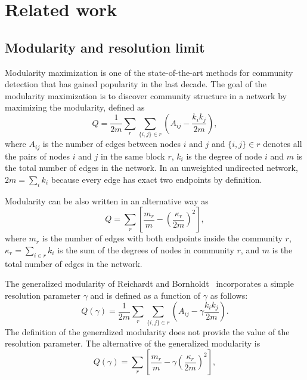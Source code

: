 \section{Related work} \label{sec:2.1}
\subsection{Modularity and resolution limit} \label{sec:2.1.1}
Modularity maximization is one of the state-of-the-art methods for community detection that has gained popularity in the last decade. The goal of the modularity maximization is to discover community structure in a network by maximizing the modularity, defined as
\begin{equation} \label{eq:definition}
    Q = \frac{1}{2m} \sum_{r} \sum_{\{i,j\}\in r} \left( A_{ij} - \frac{ k_i k_j }{ 2m } \right),
\end{equation}
where $A_{ij}$ is the number of edges between nodes $i$ and $j$ and $\{i,j\} \in r$ denotes all the pairs of nodes $i$ and $j$ in the same block $r$, $k_i$ is the degree of node $i$ and $m$ is the total number of edges in the network. In an unweighted undirected network, $2 m = \sum_i k_i$ because every edge has exact two endpoints by definition.

Modularity can be also written in an alternative way as
\begin{equation} \label{eq:modularity_definition_alternative}
    Q = \sum_{r} \left[\frac{m_r}{m} - \left(\frac{\kappa_r}{ 2m } \right)^2 \right],
\end{equation}
where $m_r$ is the number of edges with both endpoints inside the community $r$, $\kappa_r = \sum_{i \in r} k_i$ is the sum of the degrees of nodes in community $r$, and $m$ is the total number of edges in the network.

The generalized modularity of Reichardt and Bornholdt~\cite{reichardt2006statistical} incorporates a simple resolution parameter $\gamma$ and is defined as a function of $\gamma$ as follows:
\begin{equation} \label{eq:modularity_definition}
    Q(\gamma) = \frac{1}{2m} \sum_{r} \sum_{\{i,j\}\in r} \left( A_{ij} - \gamma \frac{ k_i k_j }{ 2m } \right).
\end{equation}
The definition of the generalized modularity does not provide the value of the resolution parameter. The alternative of the generalized modularity is
\begin{equation} \label{eq:g_modularity_definition_alternative}
    Q(\gamma) = \sum_{r} \left[\frac{m_r}{m} - \gamma \left(\frac{ \kappa_r }{ 2m } \right)^2 \right],
\end{equation}

